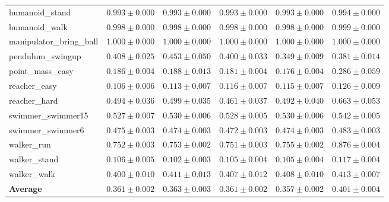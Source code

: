 \begin{tabular}{lrrrrr}
  humanoid\_stand & $0.993\pm0.000$ & $0.993\pm0.000$ & $0.993\pm0.000$ & $0.993\pm0.000$ & $0.994\pm0.000$ \\
  humanoid\_walk & $0.998\pm0.000$ & $0.998\pm0.000$ & $0.998\pm0.000$ & $0.998\pm0.000$ & $0.999\pm0.000$ \\
  manipulator\_bring\_ball & $1.000\pm0.000$ & $1.000\pm0.000$ & $1.000\pm0.000$ & $1.000\pm0.000$ & $1.000\pm0.000$ \\
  pendulum\_swingup & $0.408\pm0.025$ & $0.453\pm0.050$ & $0.400\pm0.033$ & $\mathbf{0.349\pm0.009}$ & $0.381\pm0.014$ \\
  point\_mass\_easy & $0.186\pm0.004$ & $0.188\pm0.013$ & $0.181\pm0.004$ & $\mathbf{0.176\pm0.004}$ & $0.286\pm0.059$ \\
  reacher\_easy & $0.106\pm0.006$ & $0.113\pm0.007$ & $0.116\pm0.007$ & $0.115\pm0.007$ & $0.126\pm0.009$ \\
  reacher\_hard & $0.494\pm0.036$ & $0.499\pm0.035$ & $0.461\pm0.037$ & $0.492\pm0.040$ & $0.663\pm0.053$ \\
  swimmer\_swimmer15 & $0.527\pm0.007$ & $0.530\pm0.006$ & $0.528\pm0.005$ & $0.530\pm0.006$ & $0.542\pm0.005$ \\
  swimmer\_swimmer6 & $0.475\pm0.003$ & $0.474\pm0.003$ & $0.472\pm0.003$ & $0.474\pm0.003$ & $0.483\pm0.003$ \\
  walker\_run & $0.752\pm0.003$ & $0.753\pm0.002$ & $0.751\pm0.003$ & $0.755\pm0.002$ & $0.876\pm0.004$ \\
  walker\_stand & $0.106\pm0.005$ & $0.102\pm0.003$ & $0.105\pm0.004$ & $0.105\pm0.004$ & $0.117\pm0.004$ \\
  walker\_walk & $0.400\pm0.010$ & $0.411\pm0.013$ & $0.407\pm0.012$ & $0.408\pm0.010$ & $0.413\pm0.007$ \\
  \midrule
  \textbf{Average} & $0.361\pm0.002$ & $0.363\pm0.003$ & $0.361\pm0.002$ & $0.357\pm0.002$ & $0.401\pm0.004$ \\
  \bottomrule
\end{tabular}
